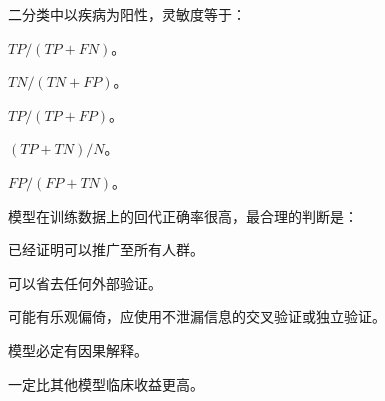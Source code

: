 \par\addvspace{6pt}\noindent\begin{minipage}{\linewidth}


二分类中以疾病为阳性，灵敏度等于：


\begin{choices}

\item \(TP/(TP+FN)\)。

\item \(TN/(TN+FP)\)。

\item \(TP/(TP+FP)\)。

\item \((TP+TN)/N\)。

\item \(FP/(FP+TN)\)。

\end{choices}

\end{minipage}\par\vspace{4pt}

\par\addvspace{6pt}\noindent\begin{minipage}{\linewidth}


模型在训练数据上的回代正确率很高，最合理的判断是：


\begin{choices}

\item 已经证明可以推广至所有人群。

\item 可以省去任何外部验证。

\item 可能有乐观偏倚，应使用不泄漏信息的交叉验证或独立验证。

\item 模型必定有因果解释。

\item 一定比其他模型临床收益更高。

\end{choices}

\end{minipage}\par\vspace{4pt}

